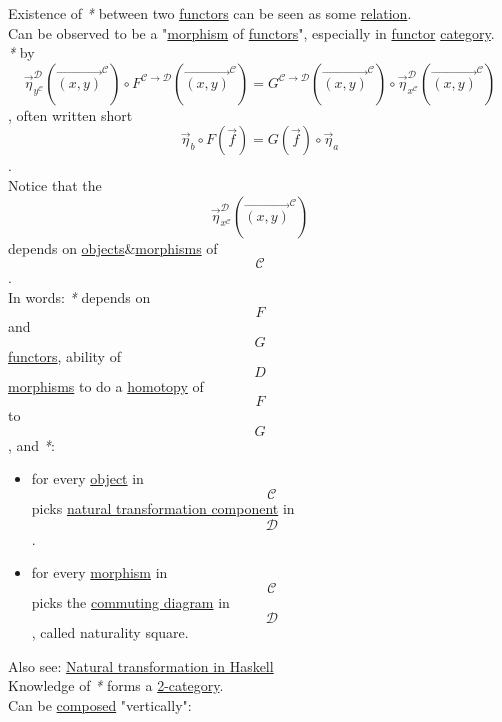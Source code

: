 \documentclass[11pt]{article}
\begin{document}
Existence of \emph{*} between two \hyperref[org6c3c2a6]{functors} can be seen as some \hyperref[org6e8ae46]{relation}.\\

Can be observed to be a "\hyperref[orgad99fc6]{morphism} of \hyperref[org6c3c2a6]{functors}", especially in \hyperref[org6073683]{functor} \hyperref[org3e3a79b]{category}.\\
\emph{*} by $$ \overrightarrow{\eta}^{\mathcal{D}}_{y^{\mathcal{C}}}(\overrightarrow{(x,y)}^{\mathcal{C}}) \circ F^{\mathcal{C \to D}}(\overrightarrow{(x,y)}^{\mathcal{C}}) = G^{\mathcal{C \to D}}(\overrightarrow{(x,y)}^{\mathcal{C}}) \circ \overrightarrow{\eta}^{\mathcal{D}}_{x^{\mathcal{C}}}(\overrightarrow{(x,y)}^{\mathcal{C}}) $$, often written short $$ \overrightarrow{\eta}_{b} \circ F(\overrightarrow{f}) = G(\overrightarrow{f}) \circ \overrightarrow{\eta}_{a} $$.\\
Notice that the $$ \overrightarrow{\eta}^{\mathcal{D}}_{x^{\mathcal{C}}}(\overrightarrow{(x,y)}^{\mathcal{C}}) $$ depends on \hyperref[orge0f000f]{objects}\&\hyperref[org8ed0ce8]{morphisms} of $$ \mathcal{C} $$.\\

In words: \emph{*} depends on $$ F $$ and $$ G $$ \hyperref[org6c3c2a6]{functors}, ability of $$ D $$ \hyperref[org8ed0ce8]{morphisms} to do a \hyperref[orgc7221e4]{homotopy} of $$ F $$ to $$ G $$, and \emph{*}:\\
\begin{itemize}
\item for every \hyperref[org025aac8]{object} in $$ \mathcal{C} $$ picks \hyperref[org8ce8d85]{natural transformation component} in $$ \mathcal{D} $$.\\
\item for every \hyperref[orgad99fc6]{morphism} in $$ \mathcal{C} $$ picks the \hyperref[org1cee6f8]{commuting diagram} in $$ \mathcal{D} $$, called \label{orgb62ef83}naturality square.\\
\end{itemize}

Also see: \hyperref[org5f09325]{Natural transformation in Haskell}\\

Knowledge of \emph{*} forms a \hyperref[org80e6f86]{2-category}.\\

Can be \hyperref[orgb941f76]{composed} "vertically":\\

\end{document}
